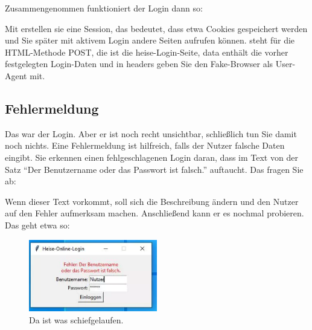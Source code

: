 Zusammengenommen funktioniert der Login dann so:

\medskip


\medskip

Mit  erstellen sie eine Session, das bedeutet, dass etwa Cookies gespeichert werden und Sie später mit aktivem Login andere Seiten aufrufen können.  steht für die HTML-Methode POST, die  ist die heise-Login-Seite, data enthält die vorher festgelegten Login-Daten und in headers geben Sie den Fake-Browser als User-Agent mit.


\subsection{Fehlermeldung}

Das war der Login. Aber er ist noch recht unsichtbar, schließlich tun Sie damit noch nichts. Eine Fehlermeldung ist hilfreich, falls der Nutzer falsche Daten eingibt. Sie erkennen einen fehlgeschlagenen Login daran, dass im Text von  der Satz ``Der Benutzername oder das Passwort ist falsch.'' auftaucht. Das fragen Sie ab:

\medskip


\medskip

Wenn dieser Text vorkommt, soll sich die Beschreibung ändern und den Nutzer auf den Fehler aufmerksam machen. Anschließend kann er es nochmal probieren. Das geht etwa so:

\medskip


\medskip

\begin{figure}
    \includegraphics[width=0.5\textwidth]{Images/TKinter/TkinterError}
    \caption{Da ist was schiefgelaufen.} \label{TkinterError}
\end{figure}




